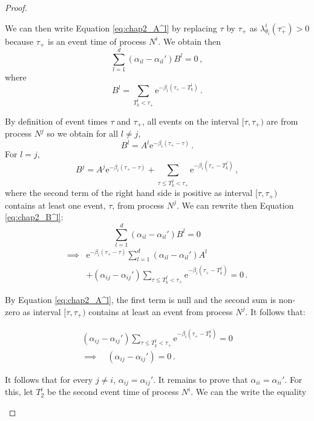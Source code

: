 \begin{subappendices}
\begin{proof}
\begin{itemize}
      We can then write Equation \eqref{eq:chap2_A^l} by replacing $\tau$ by $\tau_+$ as $\lambda_{\theta_i}^i(\tau_+^-) > 0$ because $\tau_+$ is an event time of process $N^i$.  We obtain then
      \begin{equation}\label{eq:chap2_B^l}
          \sum_{l=1}^{d}{(\alpha_{il} - \alpha_{il}')B^l} = 0\,,
      \end{equation}
      where \[B^l = \sum_{T_k^l < \tau_+}{\mathrm{e}^{-\beta_i(\tau_+ - T_k^l)}}\,.\]
      
     By definition of event times $\tau$ and $\tau_+$, all events on the interval $[\tau, \tau_+)$ are from process $N^j$ so we obtain for all $l \neq j$, \[B^l = A^l \mathrm{e}^{-\beta_i(\tau_+ - \tau)}\,.\] 
      For $l=j$, 
      \[B^j = A^j\mathrm{e}^{-\beta_i(\tau_+ - \tau)} + \sum_{\tau \leq T_k^j < \tau_+}{\mathrm{e}^{-\beta_i(\tau_+ - T_k^j)}}\,,\] 
      where the second term of the right hand side is positive as interval $[\tau, \tau_+)$ contains at least one event, $\tau$, from process $N^j$. 
      We can rewrite then Equation \eqref{eq:chap2_B^l}:
      \begin{equation*}
      \sum_{l=1}^{d}{(\alpha_{il} - \alpha_{il}')B^l} = 0
      \end{equation*}
      \begin{align*}
      \implies &\mathrm{e}^{-\beta_i(\tau_+ - \tau)}\sum_{l=1}^{d}{(\alpha_{il} - \alpha_{il}')A^l} \\
      &+ (\alpha_{ij}-\alpha_{ij}')\sum_{\tau \leq T_k^j < \tau_+}{\mathrm{e}^{-\beta_i(\tau_+ - T_k^j)}} = 0\,.
      \end{align*}
          
      By Equation \eqref{eq:chap2_A^l}, the first term is null and the second sum is non-zero as interval $[\tau, \tau_+)$ contains at least an event from process $N^j$. It follows that:
      
      \begin{gather*}
          (\alpha_{ij}-\alpha_{ij}')\sum_{\tau \leq T_k^j < \tau_+}{\mathrm{e}^{-\beta_i(\tau_+ - T_k^j)}} = 0\\
          \implies \quad (\alpha_{ij}-\alpha_{ij}') = 0\,.
      \end{gather*}
      
      It follows that for every $j\neq i$, $\alpha_{ij}=\alpha_{ij}'$. It remains to prove that $\alpha_{ii}=\alpha_{ii}'$. For this, let $T^i_2$ be the second event time of process $N^i$. We can the write the equality 
      

\end{itemize}
\end{proof}
\end{subappendices}
